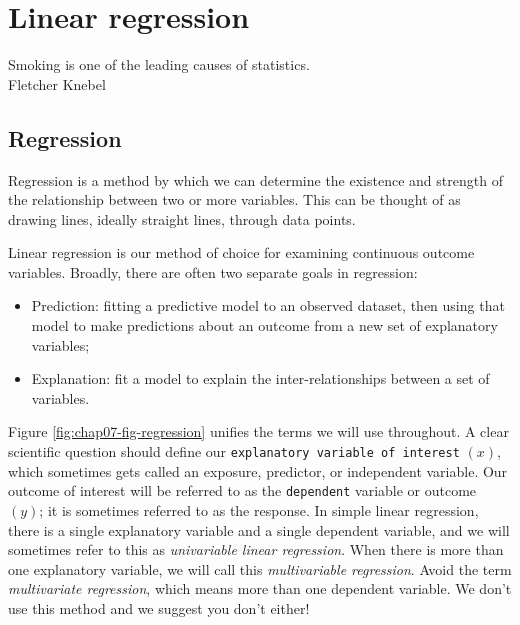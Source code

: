 \documentclass[
  12pt,
  krantz2]{krantz}
\providecommand{\tightlist}{%
  \setlength{\itemsep}{0pt}\setlength{\parskip}{0pt}}
\renewenvironment{quote}{\begin{VF}}{\end{VF}}
\begin{document}
\hypertarget{chap07-h1}{%
\chapter{Linear regression}\label{chap07-h1}}


\begin{quote}
Smoking is one of the leading causes of statistics.\\
Fletcher Knebel
\end{quote}

\hypertarget{regression}{%
\section{Regression}\label{regression}}

Regression is a method by which we can determine the existence and strength of the relationship between two or more variables.
This can be thought of as drawing lines, ideally straight lines, through data points.

Linear regression is our method of choice for examining continuous outcome variables.
Broadly, there are often two separate goals in regression:

\begin{itemize}
\tightlist
\item
  Prediction: fitting a predictive model to an observed dataset, then using that model to make predictions about an outcome from a new set of explanatory variables;
\item
  Explanation: fit a model to explain the inter-relationships between a set of variables.
\end{itemize}

Figure \ref{fig:chap07-fig-regression} unifies the terms we will use throughout.
A clear scientific question should define our \texttt{explanatory\ variable\ of\ interest} \((x)\), which sometimes gets called an exposure, predictor, or independent variable.
Our outcome of interest will be referred to as the \texttt{dependent} variable or outcome \((y)\); it is sometimes referred to as the response.
In simple linear regression, there is a single explanatory variable and a single dependent variable, and we will sometimes refer to this as \emph{univariable linear regression}.
When there is more than one explanatory variable, we will call this \emph{multivariable regression}.
Avoid the term \emph{multivariate regression}, which means more than one dependent variable.
We don't use this method and we suggest you don't either!
\end{document}
